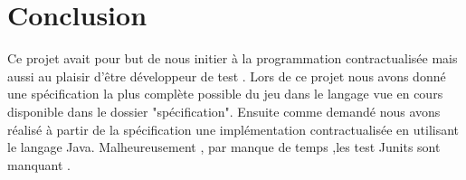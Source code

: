 \part{Conclusion}
Ce projet avait pour but de nous initier à la programmation contractualisée mais aussi au plaisir d'être développeur de test .	
	Lors de ce projet  nous avons donné une spécification la plus complète possible du jeu dans le langage vue en cours disponible dans le dossier "spécification".
	Ensuite comme demandé nous avons réalisé à partir de la spécification  une implémentation contractualisée en utilisant le langage Java.
	Malheureusement , par manque de temps ,les test Junits sont manquant .
	 
	

